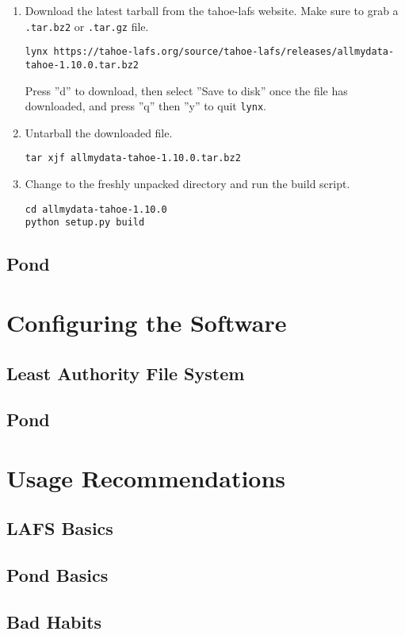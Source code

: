 \documentclass[letterpaper]{article}
\begin{document}
\begin{enumerate}

\item
Download the latest tarball from the tahoe-lafs website.  Make sure to grab a
\verb=.tar.bz2= or \verb=.tar.gz= file.
\begin{verbatim}
lynx https://tahoe-lafs.org/source/tahoe-lafs/releases/allmydata-tahoe-1.10.0.tar.bz2
\end{verbatim}
Press ''d'' to download, then select ''Save to disk'' once the file has
downloaded, and press ''q'' then ''y'' to quit \verb=lynx=.

\item
Untarball the downloaded file.
\begin{verbatim}
tar xjf allmydata-tahoe-1.10.0.tar.bz2
\end{verbatim}

\item
Change to the freshly unpacked directory and run the build script.
\begin{verbatim}
cd allmydata-tahoe-1.10.0
python setup.py build
\end{verbatim}

\end{enumerate}

\subsection{Pond}

\section{Configuring the Software}

\subsection{Least Authority File System}

\subsection{Pond}

\section{Usage Recommendations}

\subsection{LAFS Basics}

\subsection{Pond Basics}

\subsection{Bad Habits}
\end{document}
